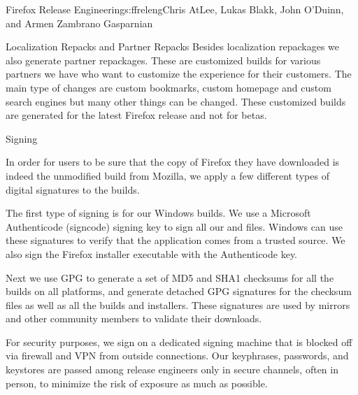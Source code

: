 \begin{aosachapter}{Firefox Release Engineering}{s:ffreleng}{Chris AtLee, Lukas Blakk, John O'Duinn, and Armen Zambrano Gasparnian}
\begin{aosasect1}{Localization Repacks and Partner Repacks}
Besides localization repackages we also generate partner
repackages. These are customized builds for various partners we have
who want to customize the experience for their customers.  The main
type of changes are custom bookmarks, custom homepage and custom
search engines but many other things can be changed. These customized
builds are generated for the latest Firefox release and not for betas.

\end{aosasect1}

\begin{aosasect1}{Signing}

In order for users to be sure that the copy of Firefox they have
downloaded is indeed the unmodified build from Mozilla, we apply a few different
types of digital signatures to the builds.

The first type of signing is for our Windows builds. We use a
Microsoft Authenticode (signcode) signing key to sign all our
 and  files. Windows can use these signatures to
verify that the application comes from a trusted source. We also sign
the Firefox installer executable with the Authenticode key. 

Next we use GPG to generate a set of MD5 and SHA1 checksums for
all the builds on all platforms, and generate detached GPG
signatures for the checksum files as well as all the builds and installers.
These signatures are used by mirrors and other community members
to validate their downloads.

For security purposes, we sign on a dedicated signing machine that is
blocked off via firewall and VPN from outside connections. Our
keyphrases, passwords, and keystores are passed among release
engineers only in secure channels, often in person, to minimize the
risk of exposure as much as possible.



\end{aosasect1}
\end{aosachapter}
